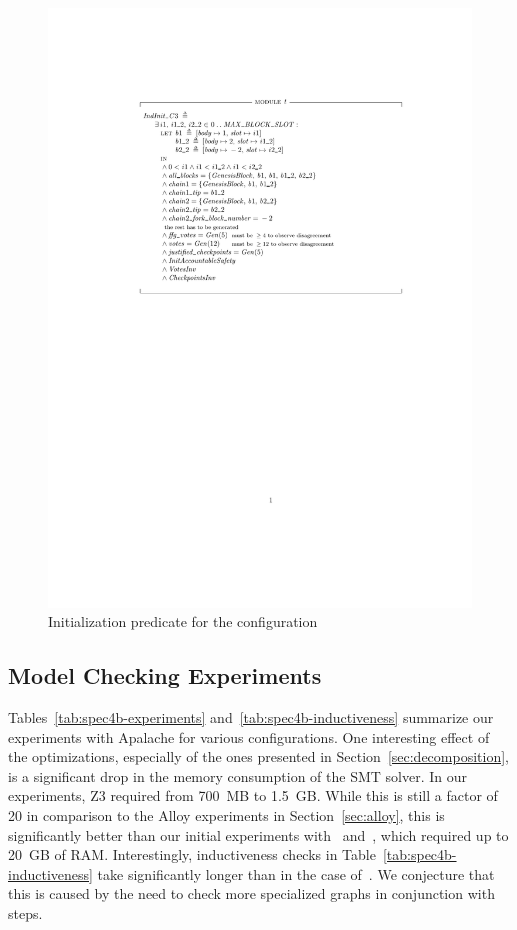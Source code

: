 \begin{figure}
    \includegraphics[width=\textwidth]{images/indinit-c3}
    \caption{Initialization predicate for the
             configuration~}\label{fig:indinit-c3}
\end{figure}

\subsection{Model Checking Experiments}

Tables~\ref{tab:spec4b-experiments} and~\ref{tab:spec4b-inductiveness}
summarize our experiments with Apalache for various configurations. One
interesting effect of the optimizations, especially of the ones presented in
Section~\ref{sec:decomposition}, is a significant drop in the memory
consumption of the SMT solver. In our experiments, Z3 required from 700~MB to
1.5~GB\@. While this is still a factor of 20 in comparison to the Alloy
experiments in Section~\ref{sec:alloy}, this is significantly better than our
initial experiments with~\SpecTwo{} and~\SpecThree{}, which required up to
20~GB of RAM\@. Interestingly, inductiveness checks in
Table~\ref{tab:spec4b-inductiveness} take significantly longer than in the case
of~\SpecFour{}. We conjecture that this is caused by the need to check more
specialized graphs in conjunction with steps.


